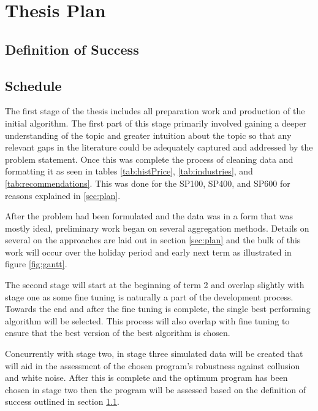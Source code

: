 \chapter{Thesis Plan}
\section{Definition of Success}\label{sec:success}


\section{Schedule}
The first stage of the thesis includes all preparation work and production of the initial algorithm. The first part of this stage primarily involved gaining a deeper understanding of the topic and greater intuition about the topic so that any relevant gaps in the literature could be adequately captured and addressed by the problem statement. Once this was complete the process of cleaning data and formatting it as seen in tables \ref{tab:histPrice}, \ref{tab:industries}, and \ref{tab:recommendations}. This was done for the SP100, SP400, and SP600 for reasons explained in \ref{sec:plan}. 

After the problem had been formulated and the data was in a form that was mostly ideal, preliminary work began on several aggregation methods. Details on several on the approaches are laid out in section \ref{sec:plan} and the bulk of this work will occur over the holiday period and early next term as illustrated in figure \ref{fig:gantt}.

The second stage will start at the beginning of term 2 and overlap slightly with stage one as some fine tuning is naturally a part of the development process. Towards the end and after the fine tuning is complete, the single best performing algorithm will be selected. This process will also overlap with fine tuning to ensure that the best version of the best algorithm is chosen.

Concurrently with stage two, in stage three simulated data will be created that will aid in the assessment of the chosen program's robustness against collusion and white noise. After this is complete and the optimum program has been chosen in stage two then the program will be assessed based on the definition of success outlined in section \ref{sec:success}.

